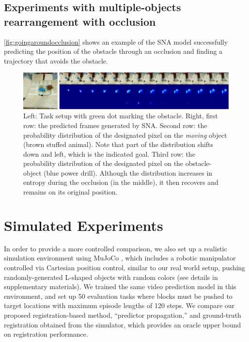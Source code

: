 \subsection{Experiments with multiple-objects rearrangement with occlusion}

\autoref{fig:goingaroundocclusion} shows an example of the SNA model successfully predicting the position of the obstacle through an occlusion and finding a trajectory that avoids the obstacle. 

\begin{figure}
	\centering
	\includegraphics[width=1\linewidth]{images_sna/multiobject_qualitative/avoid_obstacle.pdf}
	\caption{Left: Task setup with green dot marking the obstacle. Right, first row: the predicted frames generated by SNA. Second row: the probability distribution of the designated pixel on the \textit{moving} object (brown stuffed animal). Note that part of the distribution shifts down and left, which is the indicated goal. Third row: the probability distribution of the designated pixel on the obstacle-object (blue power drill). Although the distribution increases in entropy during the occlusion (in the middle), it then recovers and remains on its original position.
		\label{fig:goingaroundocclusion}}
\end{figure}


\section{Simulated Experiments}

In order to provide a more controlled comparison, we also set up a realistic simulation environment using MuJoCo \cite{todorov2012mujoco}, which includes a robotic manipulator controlled via Cartesian position control, similar to our real world setup, pushing randomly-generated L-shaped objects with random colors (see details in supplementary materials). 
We trained the same video prediction model in this environment, and set up 50 evaluation tasks where blocks must be pushed to target locations with maximum episode lengths of 120 steps. 
We  compare our proposed registration-based method, ``predictor propagation,'' and ground-truth registration obtained from the simulator, which provides an oracle upper bound on registration performance. 





